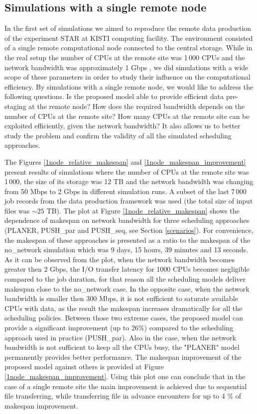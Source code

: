 \documentclass{svjour3}                     %
\begin{document}
\subsection{Simulations with a single remote node}
In the first set of simulations we aimed to reproduce the remote data production of the experiment STAR at KISTI computing facility. The environment consisted of a single remote computational node connected to the central storage. While in the real setup the number of CPUs at the remote site was 1\,000 CPUs and the network bandwidth was approximately 1 Gbps \cite{KISTI-production}, we did simulations with a wide scope of these parameters in order to study their influence on the computational efficiency. By simulations with a single remote node, we would like to address the following questions. Is the proposed model able to provide efficient data pre-staging at the remote node? How does the required bandwidth depends on the number of CPUs at the remote site? How many CPUs at the remote site can be exploited efficiently, given the network bandwidth? It also allows us to better study the problem and confirm the validity of all the simulated scheduling approaches.


The Figures \ref{1node_relative_makespan} and \ref{1node_makespan_improvement} present results of simulations where the number of CPUs at the remote site was 1\,000, the size of its storage was 12 TB and the network bandwidth was changing from 50 Mbps to 2 Gbps in different simulation runs. A subset of the last 7\,000 job records from the data production framework was used (the total size of input files was $\sim25$ TB). The plot at Figure \ref{1node_relative_makespan} shows the dependence of makespan on network bandwidth for three scheduling approaches (PLANER, PUSH\_par and PUSH\_seq, see Section \ref{scenarios}). For convenience, the makespan of these approaches is presented as a ratio to the makespan of the no\_network simulation which was 9 days, 15 hours, 39 minutes and 13 seconds. As it can be observed from the plot, when the network bandwidth becomes greater then 2 Gbps, the I/O transfer latency for 1000 CPUs becomes negligible compared to the job duration, for that reason all the scheduling models deliver makespan close to the no\_network case. In the opposite case, when the network bandwidth is smaller then 300 Mbps, it is not sufficient to saturate available CPUs with data, as the result the makespan increases dramatically for all the scheduling policies. Between those two extreme cases, the proposed model can provide a significant improvement (up to 26\%) compared to the scheduling approach used in practice (PUSH\_par). Also in the case, when the network bandwidth is not sufficient to keep all the CPUs busy, the "PLANER" model permanently provides better performance. The makespan improvement of the proposed model against others is provided at Figure \ref{1node_makespan_improvement}. Using this plot one can conclude that in the case of a single remote site the main improvement is achieved due to sequential file transferring, while transferring file in advance encounters for up to 4 \% of makespan improvement.
\end{document}
